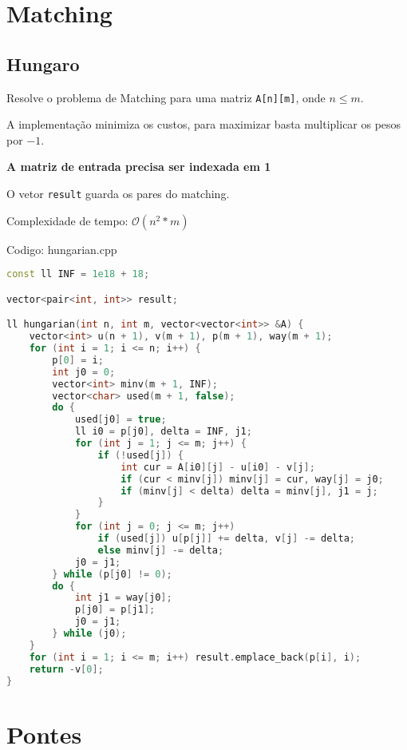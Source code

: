 \documentclass[10pt, a4paper, oneside]{book}
\begin{document}
\section{Matching}
\subsection{Hungaro}


Resolve o problema de Matching para uma matriz \texttt{A[n][m]}, onde $n \leq m$.



A implementação minimiza os custos, para maximizar basta multiplicar os pesos por $-1$.



\textbf{A matriz de entrada precisa ser indexada em 1}



O vetor \texttt{result} guarda os pares do matching.



Complexidade de tempo: $\mathcal{O}(n^2 * m)$

\hfill

Codigo: hungarian.cpp

\begin{lstlisting}[language=C++]
const ll INF = 1e18 + 18;

vector<pair<int, int>> result;

ll hungarian(int n, int m, vector<vector<int>> &A) {
    vector<int> u(n + 1), v(m + 1), p(m + 1), way(m + 1);
    for (int i = 1; i <= n; i++) {
        p[0] = i;
        int j0 = 0;
        vector<int> minv(m + 1, INF);
        vector<char> used(m + 1, false);
        do {
            used[j0] = true;
            ll i0 = p[j0], delta = INF, j1;
            for (int j = 1; j <= m; j++) {
                if (!used[j]) {
                    int cur = A[i0][j] - u[i0] - v[j];
                    if (cur < minv[j]) minv[j] = cur, way[j] = j0;
                    if (minv[j] < delta) delta = minv[j], j1 = j;
                }
            }
            for (int j = 0; j <= m; j++)
                if (used[j]) u[p[j]] += delta, v[j] -= delta;
                else minv[j] -= delta;
            j0 = j1;
        } while (p[j0] != 0);
        do {
            int j1 = way[j0];
            p[j0] = p[j1];
            j0 = j1;
        } while (j0);
    }
    for (int i = 1; i <= m; i++) result.emplace_back(p[i], i);
    return -v[0];
}
\end{lstlisting}
\hfill

\section{Pontes}
\end{document}
